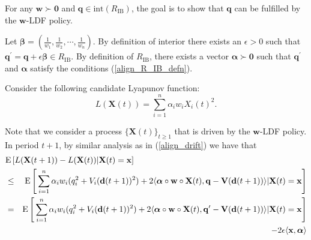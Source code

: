 \documentclass[prodmode,acmtompecs]{acmsmall}
\newcommand{\reqvec}{\mathbf{q}}
\newcommand{\reqscalar}{q}
\newcommand{\ribvec}{\boldsymbol{\alpha}}
\newcommand{\ribscalar}{\alpha}
\begin{document}
For any $\mathbf{w} \succ \mathbf{0}$ and $\reqvec \in \text{int}(R_\text{IB})$, the goal is to show that $\reqvec$ can be fulfilled by the $\mathbf{w}$-LDF policy. 

Let $\boldsymbol{\beta} = (\frac{1}{w_1}, \frac{1}{w_2}, \cdots, \frac{1}{w_n})$. 
By definition of interior there exists an $\epsilon>0$ such that ${\reqvec}^\prime = \reqvec + \epsilon\boldsymbol{\beta} \in R_{\text{IB}}$. 
By definition of $R_{\text{IB}}$, there exists a vector $\ribvec \succ \mathbf{0}$ such that $\reqvec^\prime$ and $\ribvec$ satisfy the conditions (\ref{align_R_IB_defn}). 

Consider the following candidate Lyapunov function: 
$$
L(\mathbf{X}(t)) = \sum\limits_{i=1}^{n} {\ribscalar}_i w_i X_i(t)^2. 
$$

Note that we consider a process $\{\mathbf{X}(t)\}_{t\geq 1}$ that is driven by the $\mathbf{w}$-LDF policy. In period $t+1$, by similar analysis as in (\ref{align_drift}) we have that
\begin{eqnarray}
\lefteqn{\expectation\left[L(\mathbf{X}(t+1)) - L(\mathbf{X}(t)) | \mathbf{X}(t) = \mathbf{x}\right]} \notag \\
& \leq & \expectation\Bigg[\sum\limits_{i=1}^{n} {\ribscalar}_i w_i (\reqscalar_i^2 + V_i(\mathbf{d}(t+1))^2) + 2 \langle \ribvec \circ \mathbf{w} \circ \mathbf{X}(t), \reqvec - \mathbf{V}(\mathbf{d}(t+1)) \rangle | \mathbf{X}(t) = \mathbf{x} \Bigg] 	\notag \\ 
& = & \expectation \Bigg[ \sum\limits_{i=1}^{n} {\ribscalar}_i w_i (\reqscalar_i^2 + V_i(\mathbf{d}(t+1))^2) + 2\langle \ribvec \circ \mathbf{w} \circ \mathbf{X}(t), {\reqvec}^\prime - \mathbf{V}(\mathbf{d}(t+1)) \rangle | \mathbf{X}(t) = \mathbf{x}\Bigg]	\notag	\\
& & - 2\epsilon\langle \mathbf{x}, \ribvec \rangle	\label{align_LDF_drift_chap2}
\end{eqnarray}
\end{document}
